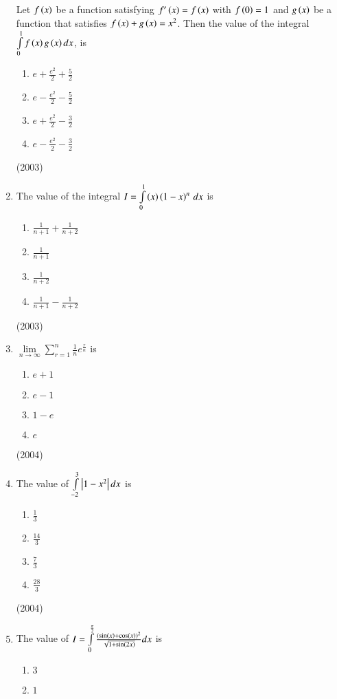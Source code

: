 \documentclass[journal,12pt,twocolumn]{IEEEtran}
\theoremstyle{remark}
\begin{document}
\begin{enumerate}
		Let $f\left(x\right)$ be a function satisfying $f'\left(x\right) = f\left(x\right)$ with $f\left(0\right)=1$ and $g\left(x\right)$ be a function that satisfies $f\left(x\right) + g\left(x\right)=x^2$. Then the value of the integral $\int \limits_0^1 f\left(x\right)g\left(x\right)dx$, is
			\begin {enumerate}
				\item $e+ \frac{e^2}{2} + \frac{5}{2}$
				\item $e- \frac{e^2}{2} - \frac{5}{2}$
				\item $e+ \frac{e^2}{2} - \frac{3}{2}$
				\item $e- \frac{e^2}{2} - \frac{3}{2}$
			\end {enumerate}
			\hfill (2003)
	\item
		The value of the integral $I = \int \limits_0^1 \left(x\right)\left(1-x\right)^n \, dx$ is
			\begin{enumerate}
				\item $\frac{1}{n+1} + \frac{1}{n+2}$
				\item $\frac{1}{n+1}$
				\item $\frac{1}{n+2}$
				\item $\frac{1}{n+1} - \frac{1}{n+2}$
			\end{enumerate}
			\hfill (2003)
	\item
		$\lim \limits_{n \to \infty} \sum \limits_{r=1}^{n} \frac{1}{n} e^{\frac{r}{n}}$ is
			\begin{enumerate}
				\item $e+1$
				\item $e-1$
				\item $1-e$
				\item $e$	
			\end{enumerate}
			\hfill (2004)
	\item 
		The value of $\int \limits_{-2}^{3} \left\vert1-x^2\right\vert dx$ is 
			\begin{enumerate}
				\item $\frac{1}{3}$
				\item $\frac{14}{3}$
				\item $\frac{7}{3}$
				\item $\frac{28}{3}$
			\end{enumerate}
			\hfill (2004)
	\item
		The value of $I = \int \limits_0^{\frac{\pi}{2}} \frac{(\sin \left(x\right) + \cos \left(x\right))^2}{\sqrt{1+ \sin \left(2x\right)}} dx$ is
			\begin{enumerate}
				\item $3$
				\item $1$

\end{enumerate}
\end{enumerate}
\end{document}
